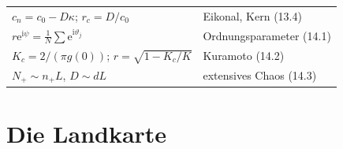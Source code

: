 \begin{merksatz}
\begin{center}
{\begin{tabular}{@{}P{4.6cm}P{4.0cm}@{}}
$c_n = c_0 - D\kappa$; $r_c = D/c_0$ & Eikonal, Kern (13.4)\\
$r\mathrm e^{\mathrm i\psi} = \frac1N\sum\mathrm e^{\mathrm i\vartheta_j}$ & Ordnungsparameter (14.1)\\
$K_c = 2/(\pi g(0))$; $r = \sqrt{1 - K_c/K}$ & Kuramoto (14.2)\\
$N_+ \sim n_+L$, $D \sim dL$ & extensives Chaos (14.3)\\
\bottomrule
\end{tabular}}
\end{center}
\end{merksatz}

\section{Die Landkarte}

